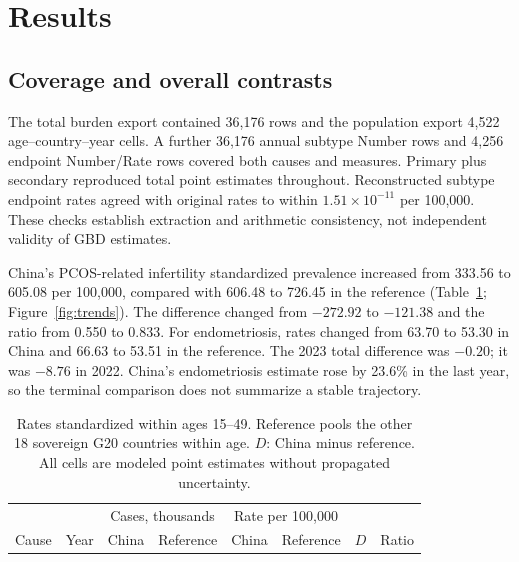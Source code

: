\documentclass[11pt,a4paper]{article}
\begin{document}
\section{Results}
\subsection{Coverage and overall contrasts}
The total burden export contained 36,176 rows and the population export 4,522 age--country--year cells. A further 36,176 annual subtype Number rows and 4,256 endpoint Number/Rate rows covered both causes and measures. Primary plus secondary reproduced total point estimates throughout. Reconstructed subtype endpoint rates agreed with original rates to within $1.51\times10^{-11}$ per 100,000. These checks establish extraction and arithmetic consistency, not independent validity of GBD estimates.

China's PCOS-related infertility standardized prevalence increased from 333.56 to 605.08 per 100,000, compared with 606.48 to 726.45 in the reference (Table~\ref{tab:prevalence}; Figure~\ref{fig:trends}). The difference changed from $-272.92$ to $-121.38$ and the ratio from 0.550 to 0.833. For endometriosis, rates changed from 63.70 to 53.30 in China and 66.63 to 53.51 in the reference. The 2023 total difference was $-0.20$; it was $-8.76$ in 2022. China's endometriosis estimate rose by 23.6\% in the last year, so the terminal comparison does not summarize a stable trajectory.



\begin{table}[htbp]\centering\small{}
\caption{Total infertility prevalence in China and the reference population.}\label{tab:prevalence}
\setlength{\tabcolsep}{3.5pt}
\begin{tabular}{llrrrrrr}\toprule
 & & \multicolumn{2}{c}{Cases, thousands} & \multicolumn{2}{c}{Rate per 100,000} & & \\
Cause & Year & China & Reference & China & Reference & $D$ & Ratio\\\midrule
\end{tabular}
\caption*{Rates standardized within ages 15--49. Reference pools the other 18 sovereign G20 countries within age. $D$: China minus reference. All cells are modeled point estimates without propagated uncertainty.}
\end{table}
\end{document}
